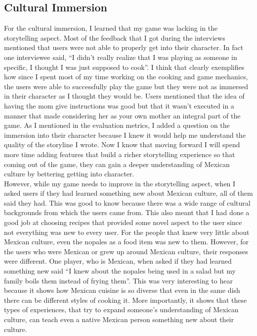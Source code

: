 \documentclass[10pt,twocolumn]{article}
\begin{document}
\subsection{Cultural Immersion}
For the cultural immersion, I learned that my game was lacking in the storytelling aspect. Most of the feedback that I got during the interviews mentioned that users were not able to properly get into their character. In fact one interviewee said, “I didn’t really realize that I was playing as someone in specific, I thought I was just supposed to cook”. I think that clearly exemplifies how since I spent most of my time working on the cooking and game mechanics, the users were able to successfully play the game but they were not as immersed in their character as I thought they would be. Users mentioned that the idea of having the mom give instructions was good but that it wasn’t executed in a manner that made considering her as your own mother an integral part of the game. As I mentioned in the evaluation metrics, I added a question on the immersion into their character because I knew it would help me understand the quality of the storyline I wrote. Now I know that moving forward I will spend more time adding features that build a richer storytelling experience so that coming out of the game, they can gain a deeper understanding of Mexican culture by bettering getting into character.
\\
However, while my game needs to improve in the storytelling aspect, when I asked users if they had learned something new about Mexican culture, all of them said they had. This was good to know because there was a wide range of cultural backgrounds from which the users came from. This also meant that I had done a good job at choosing recipes that provided some novel aspect to the user since not everything was new to every user. For the people that knew very little about Mexican culture, even the nopales as a food item was new to them. However, for the users who were Mexican or grew up around Mexican culture, their responses were different. One player, who is Mexican, when asked if they had learned something new said “I knew about the nopales being used in a salad but my family boils them instead of frying them”. This was very interesting to hear because it shows how Mexican cuisine is so diverse that even in the same dish there can be different styles of cooking it. More importantly, it shows that these types of experiences, that try to expand someone’s understanding of Mexican culture, can teach even a native Mexican person something new about their culture. 
\end{document}

